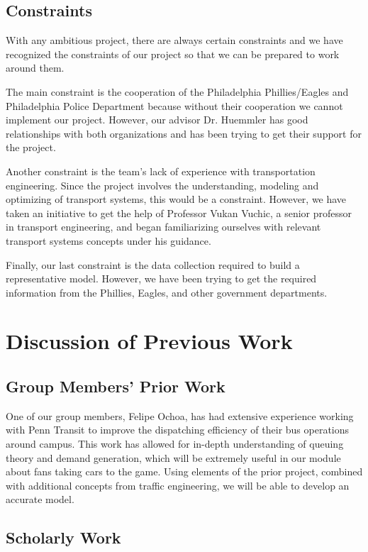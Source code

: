 \documentclass[draft,12pt,titlepage]{article}
\begin{document}
\subsection{Constraints}
With any ambitious project, there are always certain constraints and we have recognized the
constraints of our project so that we can be prepared to work around them.

The main constraint is the cooperation of the Philadelphia Phillies/Eagles and
Philadelphia Police Department because without their cooperation we cannot implement our
project. However, our advisor Dr. Huemmler has good relationships with both organizations
and has been trying to get their support for the project.

Another constraint is the team’s lack of experience with transportation engineering.
Since the project involves the understanding, modeling and optimizing of transport systems,
this would be a constraint. However, we have taken an initiative to get the help of Professor
Vukan Vuchic, a senior professor in transport engineering, and began familiarizing ourselves
with relevant transport systems concepts under his guidance.

Finally, our last constraint is the data collection required to build a representative
model. However, we have been trying to get the required information from the Phillies,
Eagles, and other government departments.

\section{Discussion of Previous Work}
\subsection{Group Members' Prior Work}
One of our group members, Felipe Ochoa, has had extensive experience working with Penn
Transit to improve the dispatching efficiency of their bus operations around campus. This
work has allowed for in-depth understanding of queuing theory and demand generation,
which will be extremely useful in our module about fans taking cars to the game. Using
elements of the prior project, combined with additional concepts from traffic engineering, we
will be able to develop an accurate model.
\subsection{Scholarly Work}
\end{document}
